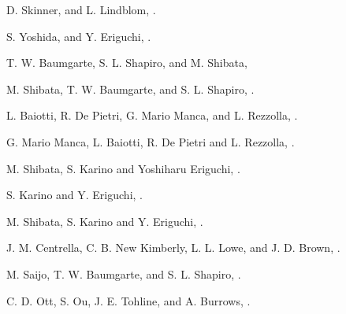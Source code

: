 
D. Skinner, and L. Lindblom, .

S. Yoshida, and Y. Eriguchi, .  


T. W. Baumgarte, S. L. Shapiro, and M. Shibata, 

M. Shibata, T. W. Baumgarte, and S. L. Shapiro, .

L. Baiotti, R. De Pietri, G. Mario Manca, and L. Rezzolla, .

G. Mario Manca, L. Baiotti, R. De Pietri and L. Rezzolla, .

M. Shibata, S. Karino and Yoshiharu Eriguchi, .

S. Karino and Y. Eriguchi, .

M. Shibata, S. Karino and Y. Eriguchi, .

J. M. Centrella, C. B. New Kimberly, L. L. Lowe, and J. D. Brown, .

M. Saijo, T. W. Baumgarte, and S. L. Shapiro, .

C. D. Ott, S. Ou, J. E. Tohline, and A. Burrows, .

